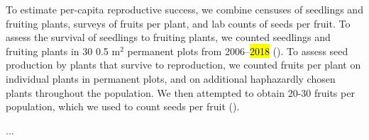 \documentclass[12pt, oneside, titlepage]{article}   	%
\begin{document}
{To estimate per-capita reproductive success, we combine censuses of seedlings and fruiting plants, surveys of fruits per plant, and lab counts of seeds per fruit. To assess the survival of seedlings to fruiting plants, we counted seedlings and fruiting plants in 30 0.5 m$^2$ permanent plots from 2006--\hl{2018} (\cite{eckhart2011}). To assess seed production by plants that survive to reproduction, we counted fruits per plant on individual plants in permanent plots, and on additional haphazardly chosen plants throughout the population. We then attempted to obtain 20-30 fruits per population, which we used to count seeds per fruit (\cite{eckhart2011}). 

\begin{singlespace*}...
 \label{tab:datasets} 
\begin{center}

\end{center}
\end{singlespace*} 

}
\end{document}
